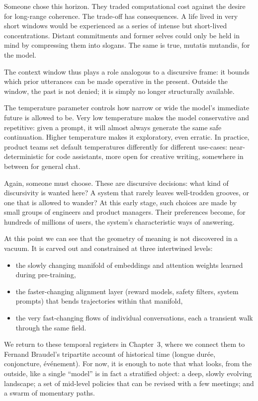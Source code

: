 Someone chose this horizon. They traded computational cost against the desire for long-range coherence. The trade-off has consequences. A life lived in very short windows would be experienced as a series of intense but short-lived concentrations. Distant commitments and former selves could only be held in mind by compressing them into slogans. The same is true, mutatis mutandis, for the model.

The context window thus plays a role analogous to a discursive frame: it bounds which prior utterances can be made operative in the present. Outside the window, the past is not denied; it is simply no longer structurally available.

The temperature parameter controls how narrow or wide the model's immediate future is allowed to be. Very low temperature makes the model conservative and repetitive: given a prompt, it will almost always generate the same safe continuation. Higher temperature makes it exploratory, even erratic. In practice, product teams set default temperatures differently for different use-cases: near-deterministic for code assistants, more open for creative writing, somewhere in between for general chat.

Again, someone must choose. These are discursive decisions: what kind of discursivity is wanted here? A system that rarely leaves well-trodden grooves, or one that is allowed to wander? At this early stage, such choices are made by small groups of engineers and product managers. Their preferences become, for hundreds of millions of users, the system's characteristic ways of answering.

At this point we can see that the geometry of meaning is not discovered in a vacuum. It is carved out and constrained at three intertwined levels:

\begin{itemize}
  \item the slowly changing manifold of embeddings and attention weights learned during pre-training,
  \item the faster-changing alignment layer (reward models, safety filters, system prompts) that bends trajectories within that manifold,
  \item the very fast-changing flows of individual conversations, each a transient walk through the same field.
\end{itemize}

We return to these temporal registers in Chapter~3, where we connect them to Fernand Braudel's tripartite account of historical time (longue dur\'ee, conjoncture, \'ev\'enement). For now, it is enough to note that what looks, from the outside, like a single ``model'' is in fact a stratified object: a deep, slowly evolving landscape; a set of mid-level policies that can be revised with a few meetings; and a swarm of momentary paths.

